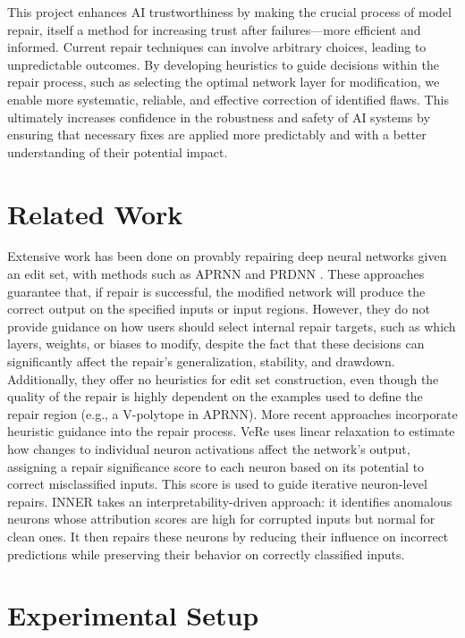\documentclass{article}
\begin{document}
This project enhances AI trustworthiness by making the crucial process of model repair, itself a method for increasing trust after failures—more efficient and informed.
Current repair techniques can involve arbitrary choices, leading to unpredictable outcomes.
By developing heuristics to guide decisions within the repair process, such as selecting the optimal network layer for modification, we enable more systematic, reliable, and effective correction of identified flaws.
This ultimately increases confidence in the robustness and safety of AI systems by ensuring that necessary fixes are applied more predictably and with a better understanding of their potential impact.

\section{Related Work}
Extensive work has been done on provably repairing deep neural networks given an edit set, with methods such as APRNN \cite{tao_architecture-preserving_2023} and PRDNN \cite{sotoudeh_provable_2021}.
These approaches guarantee that, if repair is successful, the modified network will produce the correct output on the specified inputs or input regions.
However, they do not provide guidance on how users should select internal repair targets, such as which layers, weights, or biases to modify, despite the fact that these decisions can significantly affect the repair’s generalization, stability, and drawdown.
Additionally, they offer no heuristics for edit set construction, even though the quality of the repair is highly dependent on the examples used to define the repair region (e.g., a V-polytope in APRNN).
More recent approaches incorporate heuristic guidance into the repair process.
VeRe \citep{ma_vere_2024} uses linear relaxation to estimate how changes to individual neuron activations affect the network's output, assigning a repair significance score to each neuron based on its potential to correct misclassified inputs.
This score is used to guide iterative neuron-level repairs. INNER \cite{chen_interpretability_2024} takes an interpretability-driven approach: it identifies anomalous neurons whose attribution scores are high for corrupted inputs but normal for clean ones.
It then repairs these neurons by reducing their influence on incorrect predictions while preserving their behavior on correctly classified inputs.


\section{Experimental Setup}
\end{document}
